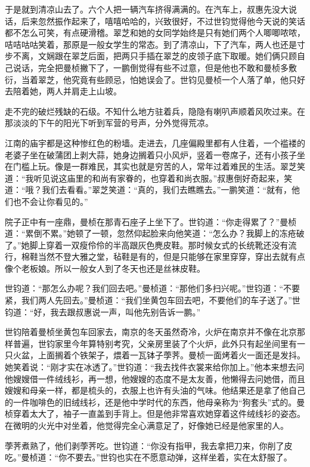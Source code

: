 \par 于是就到清凉山去了。六个人把一辆汽车挤得满满的。在汽车上，叔惠先没大说话，后来忽然振作起来了，嘻嘻哈哈的，兴致很好，不过世钧觉得他今天说的笑话都不怎么可笑，有点硬滑稽。翠芝和她的女同学始终是只有她们两个人唧唧哝哝，咭咭咕咕笑着，那原是一般女学生的常态。到了清凉山，下了汽车，两人也还是寸步不离，文娴跟在翠芝后面，把两只手插在翠芝的皮领子底下取暖。她们俩只顾自己说话，完全把曼桢撇下了，一鹏倒觉得有些不过意，但是他也不敢和曼桢多敷衍，当着翠芝，他究竟有些顾忌，怕她误会了。世钧见曼桢一个人落了单，他只好去陪着她，两人并肩走上山坡。
\par 走不完的破烂残缺的石级。不知什么地方驻着兵，隐隐有喇叭声顺着风吹过来。在那淡淡的下午的阳光下听到军营的号声，分外觉得荒凉。
\par 江南的庙宇都是这种惨红色的粉墙。走进去，几座偏殿里都有人住着，一个褴褛的老婆子坐在破蒲团上剥大蒜，她身边搁着只小风炉，竖着一卷席子，还有小孩子坐在门槛上玩。像是一群难民，其实也就是穷苦的人，常年过着难民的生活。翠芝笑道：“我听见说这庙里的和尚有家眷的，也穿着和尚衣服。”叔惠倒好奇起来，笑道：“哦？我们去看看。”翠芝笑道：“真的，我们去瞧瞧去。”一鹏笑道：“就有，他们也不会让你看见的。”
\par 院子正中有一座鼎，曼桢在那青石座子上坐下了。世钧道：“你走得累了？”曼桢道：“累倒不累。”她顿了一顿，忽然仰起脸来向他笑道：“怎么办？我脚上的冻疮破了。”她脚上穿着一双瘦伶伶的半高跟灰色麂皮鞋。那时候女式的长统靴还没有流行，棉鞋当然不登大雅之堂，毡鞋是有的，但是只能够在家里穿穿，穿出去就有点像个老板娘。所以一般女人到了冬天也还是丝袜皮鞋。
\par 世钧道：“那怎么办呢？我们回去吧。”曼桢道：“那他们多扫兴呢。”世钧道：“不要紧，我们两人先回去。”曼桢道：“我们坐黄包车回去吧，不要他们的车子送了。”世钧道：“好，我去跟叔惠说一声，叫他先别告诉一鹏。”
\par 世钧陪着曼桢坐黄包车回家去，南京的冬天虽然奇冷，火炉在南京并不像在北京那样普遍，世钧家里今年算特别考究，父亲房里装了个火炉，此外只有起坐间里有一只火盆，上面搁着个铁架子，煨着一瓦钵子荸荠。曼桢一面烤着火一面还是发抖。她笑着说：“刚才实在冰透了。”世钧道：“我去找件衣裳来给你加上。”他本来想去问他嫂嫂借一件绒线衫，再一想，他嫂嫂的态度不是太友善，他懒得去问她借，而且嫂嫂和母亲一样，都是梳头的，衣服上也许有头油的气味。他结果还是拿了他自己的一件咖啡色的旧绒线衫，还是他中学时代的东西，他母亲称为“狗套头”式的。曼桢穿着太大了，袖子一直盖到手背上。但是他非常喜欢她穿着这件绒线衫的姿态。在微明的火光中对坐着，他觉得完全心满意足了，好像她已经是他家里的人。
\par 荸荠煮熟了，他们剥荸荠吃。世钧道：“你没有指甲，我去拿把刀来，你削了皮吃。”曼桢道：“你不要去。”世钧也实在不愿意动弹，这样坐着，实在太舒服了。
